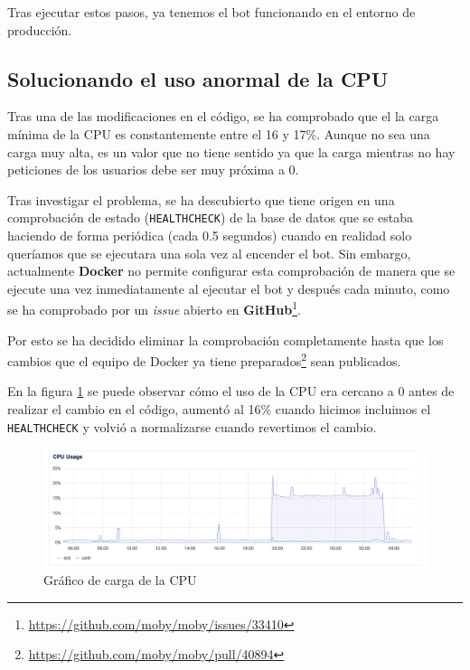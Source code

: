 Tras ejecutar estos pasos, ya tenemos el bot funcionando en el entorno de producción.

\subsection{Solucionando el uso anormal de la CPU}

Tras una de las modificaciones en el código, se ha comprobado que el la carga mínima de la CPU es constantemente entre el 16 y 17\%. Aunque no sea una carga muy alta, es un valor que no tiene sentido ya que la carga mientras no hay peticiones de los usuarios debe ser muy próxima a 0.

Tras investigar el problema, se ha descubierto que tiene origen en una comprobación de estado (\texttt{HEALTHCHECK}) de la base de datos que se estaba haciendo de forma periódica (cada 0.5 segundos) cuando en realidad solo queríamos que se ejecutara una sola vez al encender el bot. Sin embargo, actualmente \textbf{Docker} no permite configurar esta comprobación de manera que se ejecute una vez inmediatamente al ejecutar el bot y después cada minuto, como se ha comprobado por un \textit{issue} abierto en \textbf{GitHub}\footnote{\url{https://github.com/moby/moby/issues/33410}}.

Por esto se ha decidido eliminar la comprobación completamente hasta que los cambios que el equipo de Docker ya tiene preparados\footnote{\url{https://github.com/moby/moby/pull/40894}} sean publicados.

En la figura \ref{fig:usoCPUProd} se puede observar cómo el uso de la CPU era cercano a 0 antes de realizar el cambio en el código, aumentó al 16\% cuando hicimos incluimos el \texttt{HEALTHCHECK} y volvió a normalizarse cuando revertimos el cambio.

\begin{figure}[h]
\centering
\includegraphics[width=\textwidth]{imagenes/implementacion/carga_cpu_docker_health_check.png}
\caption{Gráfico de carga de la CPU}
\label{fig:usoCPUProd}
\end{figure}

